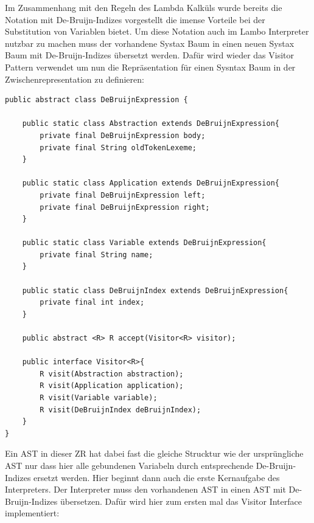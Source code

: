 \documentclass[ngerman]{article}
\begin{document}
Im Zusammenhang mit den Regeln des Lambda Kalküls wurde bereits die Notation mit De-Bruijn-Indizes vorgestellt die imense Vorteile bei der Substitution von Variablen bietet. Um diese Notation auch im Lambo Interpreter nutzbar zu machen muss der vorhandene Systax Baum in einen neuen Systax Baum mit De-Bruijn-Indizes übersetzt werden. Dafür wird wieder das Visitor Pattern verwendet um nun die Repräsentation für einen Sysntax Baum in der Zwischenrepresentation zu definieren:
\begin{lstlisting}[caption={TODO: Referenz zu Anhang}, captionpos=b]
public abstract class DeBruijnExpression {

    public static class Abstraction extends DeBruijnExpression{
        private final DeBruijnExpression body;
        private final String oldTokenLexeme;
    }

    public static class Application extends DeBruijnExpression{
        private final DeBruijnExpression left;
        private final DeBruijnExpression right;
    }

    public static class Variable extends DeBruijnExpression{
        private final String name;
    }

    public static class DeBruijnIndex extends DeBruijnExpression{
        private final int index;
    }

    public abstract <R> R accept(Visitor<R> visitor);

    public interface Visitor<R>{
        R visit(Abstraction abstraction);
        R visit(Application application);
        R visit(Variable variable);
        R visit(DeBruijnIndex deBruijnIndex);
    }
}
\end{lstlisting}
Ein AST in dieser ZR hat dabei fast die gleiche Strucktur wie der ursprüngliche AST nur dass hier alle gebundenen Variabeln durch entsprechende De-Bruijn-Indizes ersetzt werden.
Hier beginnt dann auch die erste Kernaufgabe des Interpreters. Der Interpreter muss den vorhandenen AST in einen AST mit De-Bruijn-Indizes übersetzen. Dafür wird hier zum ersten mal das Visitor Interface implementiert:
\end{document}
